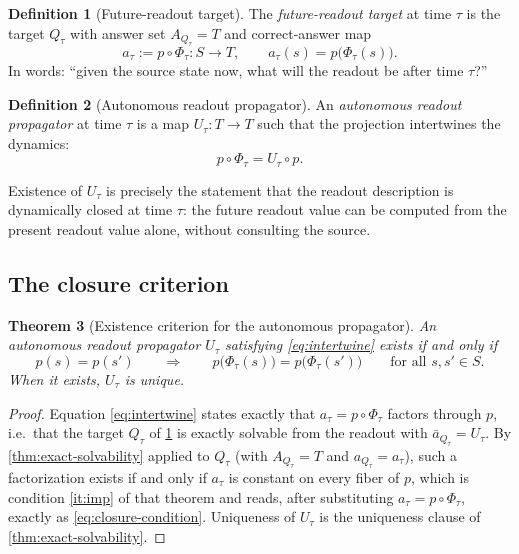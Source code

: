 \documentclass[11pt,reqno]{amsart}
\theoremstyle{plain}
\newtheorem{theorem}{Theorem}[section]
\theoremstyle{definition}
\newtheorem{definition}[theorem]{Definition}
\newcommand{\Src}{S}
\newcommand{\Rdt}{T}
\begin{document}
\begin{definition}[Future-readout target]\label{def:future-target}
The \emph{future-readout target} at time $\tau$ is the target $Q_\tau$ with answer set
$A_{Q_\tau}=\Rdt$ and correct-answer map
\begin{equation}\label{eq:atau}
a_\tau:=p\circ\Phi_\tau\colon\Src\longrightarrow\Rdt,
\qquad
a_\tau(s)=p\bigl(\Phi_\tau(s)\bigr).
\end{equation}
In words: ``given the source state now, what will the readout be after time $\tau$?''
\end{definition}

\begin{definition}[Autonomous readout propagator]\label{def:propagator}
An \emph{autonomous readout propagator} at time $\tau$ is a map $U_\tau\colon\Rdt\to\Rdt$ such
that the projection intertwines the dynamics:
\begin{equation}\label{eq:intertwine}
p\circ\Phi_\tau=U_\tau\circ p .
\end{equation}
\end{definition}

Existence of $U_\tau$ is precisely the statement that the readout description is dynamically
closed at time $\tau$: the future readout value can be computed from the present readout value
alone, without consulting the source.

\subsection{The closure criterion}

\begin{theorem}[Existence criterion for the autonomous propagator]\label{thm:closure}
An autonomous readout propagator $U_\tau$ satisfying \eqref{eq:intertwine} exists if and only if
\begin{equation}\label{eq:closure-condition}
p(s)=p(s')
\qquad\Longrightarrow\qquad
p\bigl(\Phi_\tau(s)\bigr)=p\bigl(\Phi_\tau(s')\bigr)
\qquad\text{for all } s,s'\in\Src .
\end{equation}
When it exists, $U_\tau$ is unique.
\end{theorem}

\begin{proof}
Equation \eqref{eq:intertwine} states exactly that $a_\tau=p\circ\Phi_\tau$ factors through $p$,
i.e.\ that the target $Q_\tau$ of \cref{def:future-target} is exactly solvable from the readout
with $\bar a_{Q_\tau}=U_\tau$. By \cref{thm:exact-solvability} applied to $Q_\tau$ (with
$A_{Q_\tau}=\Rdt$ and $a_{Q_\tau}=a_\tau$), such a factorization exists if and only if $a_\tau$
is constant on every fiber of $p$, which is condition \eqref{it:imp} of that theorem and reads,
after substituting $a_\tau=p\circ\Phi_\tau$, exactly as \eqref{eq:closure-condition}. Uniqueness
of $U_\tau$ is the uniqueness clause of \cref{thm:exact-solvability}.
\end{proof}
\end{document}

